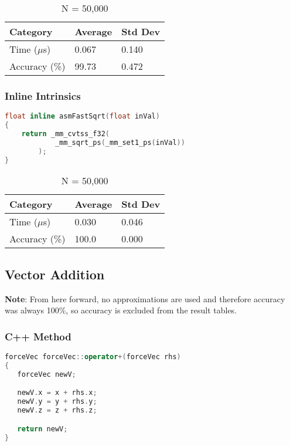 \documentclass{article}
\begin{document}
\vspace{3mm}

\begin{table}[ht!]
\centering
\begin{tabular}{l|l|l}
Category        &   Average &   Std Dev \\
\hline
Time ($\mu$s)    &   0.067   &   0.140   \\
Accuracy (\%)   &   99.73   &   0.472   \\
\end{tabular}
\caption{N = 50,000}
\end{table}

\vspace{5mm}

\subsubsection{Inline Intrinsics}

\begin{lstlisting}[language=C++]
float inline asmFastSqrt(float inVal)
{
	return _mm_cvtss_f32(
			_mm_sqrt_ps(_mm_set1_ps(inVal))
		);
}
\end{lstlisting}

\vspace{3mm}

\begin{table}[ht!]
\centering
\begin{tabular}{l|l|l}
Category        &   Average &   Std Dev \\
\hline
Time ($\mu$s)    &   0.030   &   0.046   \\
Accuracy (\%)   &   100.0   &   0.000   \\
\end{tabular}
\caption{N = 50,000}
\end{table}


\subsection{Vector Addition}

\textbf{Note}: From here forward, no approximations are used and therefore accuracy was always 100\%, so accuracy is excluded from the result tables.

\subsubsection{C++ Method}

\begin{lstlisting}[language=C++]
forceVec forceVec::operator+(forceVec rhs)
{
   forceVec newV;

   newV.x = x + rhs.x;
   newV.y = y + rhs.y;
   newV.z = z + rhs.z;

   return newV;
}
\end{lstlisting}
\end{document}
